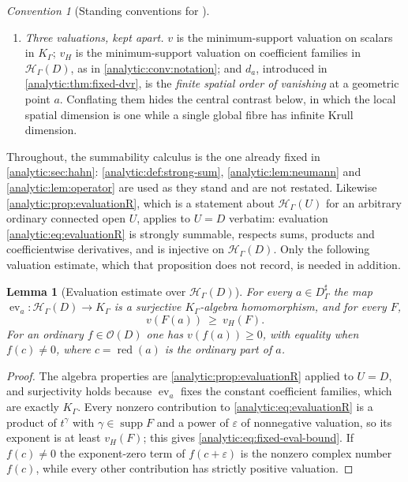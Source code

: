 \documentclass[11pt,letterpaper]{article}
\newtheorem{lemma}[theorem]{Lemma}
\theoremstyle{definition}
\theoremstyle{remark}
\newtheorem{convention}[theorem]{Convention}
\newcommand{\HH}{\mathcal H}
\newcommand{\OO}{\mathcal O}
\newcommand{\supp}{\operatorname{supp}}
\newcommand{\ev}{\operatorname{ev}}
\newcommand{\Spec}{\operatorname{Spec}}
\newcommand{\red}{\operatorname{red}}
\newcommand{\vH}{v_{\!H}}
\numberwithin{equation}{section}
\begin{document}
\begin{convention}[Standing conventions for
]
\begin{enumerate}
always means the \emph{prime spectrum} $\Spec$ of a commutative ring: a set
of prime ideals. It never means an eigenvalue list, a list of singular
values, a differential phase multiset, or a set of divisor-valuation
levels. The one competing usage introduced below is named in full every
time: the \emph{finite leading-valuation spectrum} $\mathcal V(x)$ of
\cref{analytic:thm:fixed-units} is a set of \emph{valuations}, not of prime
ideals.
\item \emph{Three valuations, kept apart.} $v$ is the minimum-support
valuation on scalars in $K_\Gamma$; $\vH$ is the minimum-support valuation
on coefficient families in $\HH_\Gamma(D)$, as in
\cref{analytic:conv:notation}; and $d_a$, introduced in
\cref{analytic:thm:fixed-dvr}, is the \emph{finite spatial order of
vanishing} at a geometric point $a$. Conflating them hides the central
contrast below, in which the local spatial dimension is one while a single
global fibre has infinite Krull dimension.
\end{enumerate}
\end{convention}

Throughout, the summability calculus is the one already fixed in
\cref{analytic:sec:hahn}: \cref{analytic:def:strong-sum},
\cref{analytic:lem:neumann} and \cref{analytic:lem:operator} are used as
they stand and are not restated. Likewise
\cref{analytic:prop:evaluationR}, which is a statement about
$\HH_\Gamma(U)$ for an arbitrary ordinary connected open $U$, applies to
$U=D$ verbatim: evaluation \eqref{analytic:eq:evaluationR} is strongly
summable, respects sums, products and coefficientwise derivatives, and is
injective on $\HH_\Gamma(D)$. Only the following valuation estimate, which
that proposition does not record, is needed in addition.

\begin{lemma}[Evaluation estimate over $\HH_\Gamma(D)$]
\label{analytic:lem:fixed-eval}
For every $a\in D^\sharp_\Gamma$ the map
$\ev_a:\HH_\Gamma(D)\to K_\Gamma$ is a surjective $K_\Gamma$-algebra
homomorphism, and for every $F$,
\begin{equation}\label{analytic:eq:fixed-eval-bound}
 v(F(a))\ \ge\ \vH(F).
\end{equation}
For an ordinary $f\in\OO(D)$ one has $v(f(a))\ge0$, with equality when
$f(c)\ne0$, where $c=\red(a)$ is the ordinary part of $a$.
\end{lemma}
\begin{proof}
The algebra properties are \cref{analytic:prop:evaluationR} applied to
$U=D$, and surjectivity holds because $\ev_a$ fixes the constant
coefficient families, which are exactly $K_\Gamma$. Every nonzero
contribution to \eqref{analytic:eq:evaluationR} is a product of $t^\gamma$
with $\gamma\in\supp F$ and a power of $\varepsilon$ of nonnegative
valuation, so its exponent is at least $\vH(F)$; this gives
\eqref{analytic:eq:fixed-eval-bound}. If $f(c)\ne0$ the exponent-zero term
of $f(c+\varepsilon)$ is the nonzero complex number $f(c)$, while every
other contribution has strictly positive valuation.
\end{proof}
\end{document}
